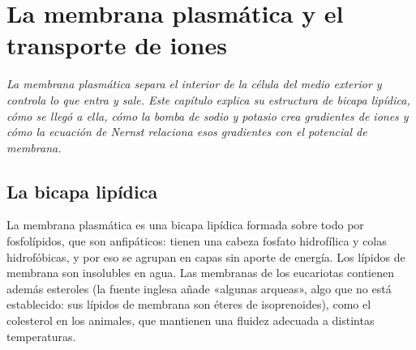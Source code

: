 \documentclass{book}
\begin{document}
\chapter{La membrana plasmática y el transporte de iones}
\label{chap:bio-02}

\noindent\textit{La membrana plasmática separa el interior de la célula del medio exterior y controla lo que entra y sale. Este capítulo explica su estructura de bicapa lipídica, cómo se llegó a ella, cómo la bomba de sodio y potasio crea gradientes de iones y cómo la ecuación de Nernst relaciona esos gradientes con el potencial de membrana.}


\section{La bicapa lipídica}

La membrana plasmática es una bicapa lipídica formada sobre todo por fosfolípidos, que son anfipáticos: tienen una cabeza fosfato hidrofílica y colas hidrofóbicas, y por eso se agrupan en capas sin aporte de energía. Los lípidos de membrana son insolubles en agua. Las membranas de los eucariotas contienen además esteroles (la fuente inglesa añade «algunas arqueas», algo que no está establecido: sus lípidos de membrana son éteres de isoprenoides), como el colesterol en los animales, que mantienen una fluidez adecuada a distintas temperaturas.

\end{document}
